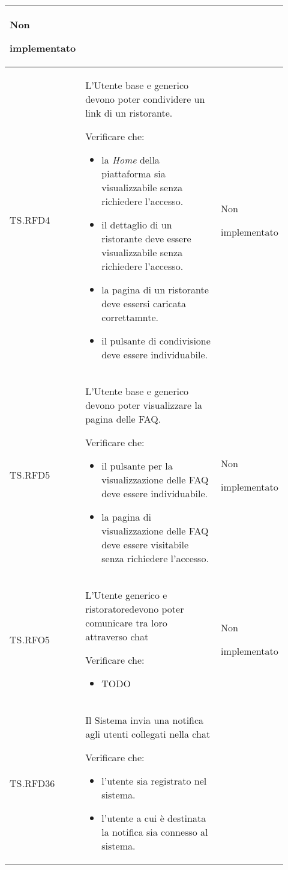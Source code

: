 \begin{longtable}{|p{0.10\linewidth}|p{0.70\linewidth}|p{0.12\linewidth}|}
    Non \par implementato  \\
    \hline
    TS.RFD4 & 
    L'Utente base e generico devono poter condividere un link di un ristorante. \par 
    Verificare che: 
    \begin{itemize}
        \item la \textit{Home} della piattaforma sia visualizzabile senza richiedere l'accesso.
        \item il dettaglio di un ristorante deve essere visualizzabile senza richiedere l'accesso.
        \item la pagina di un ristorante deve essersi caricata correttamnte.
        \item il pulsante di condivisione deve essere individuabile.
    \end{itemize}&
    Non \par implementato  \\
    \hline
    TS.RFD5 & 
    L'Utente base e generico devono poter visualizzare la pagina delle FAQ\g. \par 
    Verificare che: 
    \begin{itemize}
        \item il pulsante per la visualizzazione delle FAQ deve essere individuabile.
        \item la pagina di visualizzazione delle FAQ deve essere visitabile senza richiedere l'accesso.
    \end{itemize}&
    Non \par implementato  \\
    \hline
    TS.RFO5 & 
    L'Utente generico e ristoratore\g devono poter comunicare tra loro attraverso chat \par 
    Verificare che: 
    \begin{itemize}
        \item TODO
    \end{itemize}&
    Non \par implementato  \\
    \hline
    TS.RFD36 & 
    Il Sistema invia una notifica agli utenti collegati nella chat \par 
    Verificare che: 
    \begin{itemize}
       \item l'utente sia registrato nel sistema.
       \item l'utente a cui è destinata la notifica sia connesso al sistema.
    \end{itemize}&

\end{longtable}
